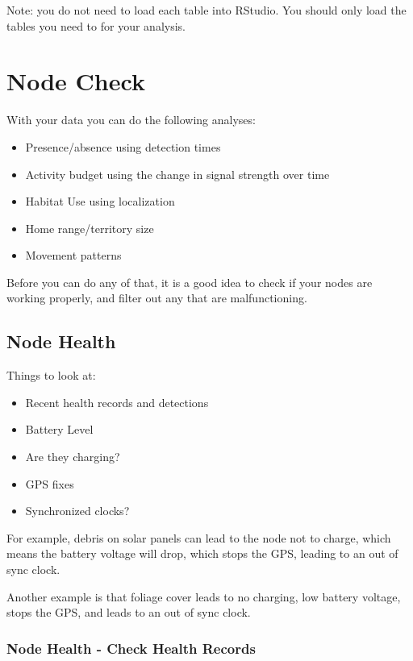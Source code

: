 \documentclass[
]{book}
\providecommand{\tightlist}{%
  \setlength{\itemsep}{0pt}\setlength{\parskip}{0pt}}
\begin{document}
Note: you do not need to load each table into RStudio. You should only load the tables you need to for your analysis.

\chapter{Node Check}\label{node-check}

With your data you can do the following analyses:

\begin{itemize}
\tightlist
\item
  Presence/absence using detection times
\item
  Activity budget using the change in signal strength over time
\item
  Habitat Use using localization
\item
  Home range/territory size
\item
  Movement patterns
\end{itemize}

Before you can do any of that, it is a good idea to check if your nodes are working properly, and filter out any that are malfunctioning.

\section{Node Health}\label{node-health}

Things to look at:

\begin{itemize}
\tightlist
\item
  Recent health records and detections
\item
  Battery Level
\item
  Are they charging?
\item
  GPS fixes
\item
  Synchronized clocks?
\end{itemize}

For example, debris on solar panels can lead to the node not to charge, which means the battery voltage will drop, which stops the GPS, leading to an out of sync clock.

Another example is that foliage cover leads to no charging, low battery voltage, stops the GPS, and leads to an out of sync clock.

\subsection{Node Health - Check Health Records}\label{node-health---check-health-records}
\end{document}
